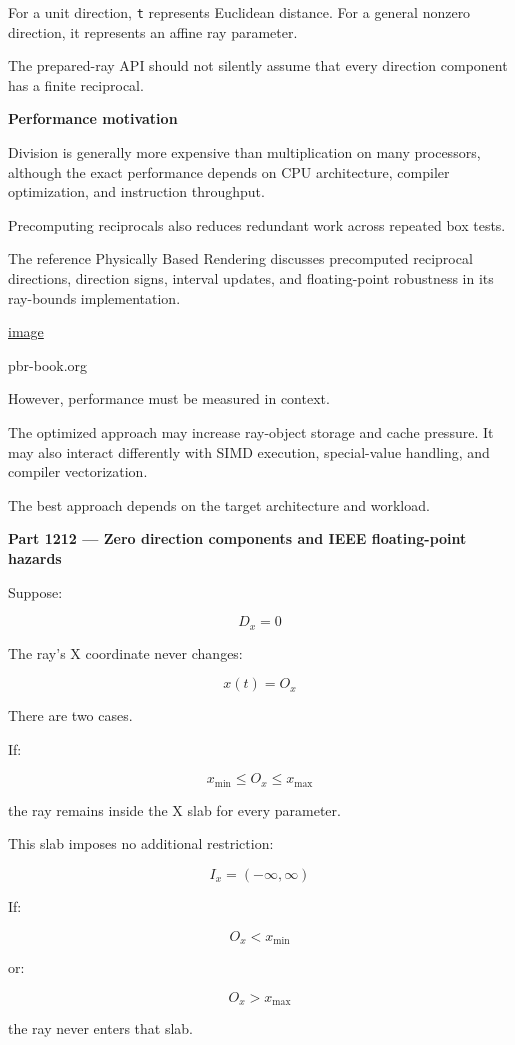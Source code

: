 For a unit direction, \texttt{t} represents Euclidean distance. For a general nonzero direction, it represents an affine ray parameter.

The prepared-ray API should not silently assume that every direction component has a finite reciprocal.

\textbf{Performance motivation}

Division is generally more expensive than multiplication on many processors, although the exact performance depends on CPU architecture, compiler optimization, and instruction throughput.

Precomputing reciprocals also reduces redundant work across repeated box tests.

The reference Physically Based Rendering discusses precomputed reciprocal directions, direction signs, interval updates, and floating-point robustness in its ray-bounds implementation. 

\href{https://www.google.com/s2/favicons?domain=https://www.pbr-book.org&sz=32}{image}

pbr-book.org

However, performance must be measured in context.

The optimized approach may increase ray-object storage and cache pressure. It may also interact differently with SIMD execution, special-value handling, and compiler vectorization.

The best approach depends on the target architecture and workload.

\textbf{Part 1212 --- Zero direction components and IEEE floating-point hazards}

Suppose:

\[
D_x=0
\]

The ray's X coordinate never changes:

\[
x(t)=O_x
\]

There are two cases.

If:

\[
x_{\min}\le O_x\le x_{\max}
\]

the ray remains inside the X slab for every parameter.

This slab imposes no additional restriction:

\[
I_x=(-\infty,\infty)
\]

If:

\[
O_x<x_{\min}
\]

or:

\[
O_x>x_{\max}
\]

the ray never enters that slab.

